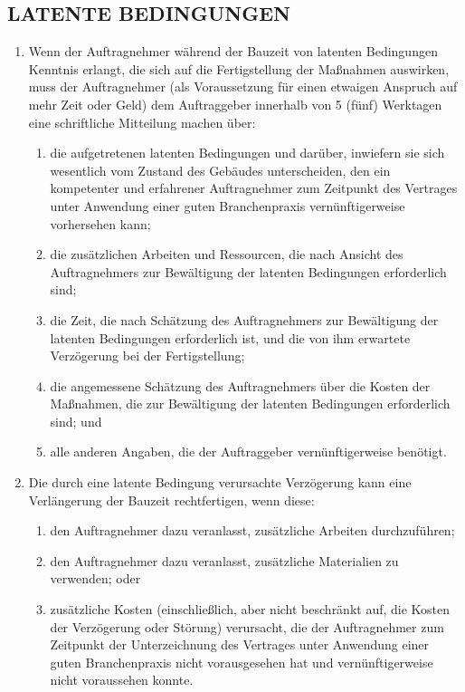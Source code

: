 \begin{multicols}{2}
  \subsection{LATENTE BEDINGUNGEN}
  \begin{enumerate}
    \item Wenn der Auftragnehmer während der Bauzeit von latenten Bedingungen Kenntnis erlangt, die sich auf die Fertigstellung der Maßnahmen auswirken, muss der Auftragnehmer (als Voraussetzung für einen etwaigen Anspruch auf mehr Zeit oder Geld) dem Auftraggeber innerhalb von 5 (fünf) Werktagen eine schriftliche Mitteilung machen über:
    \begin{enumerate}
   \item die aufgetretenen latenten Bedingungen und darüber, inwiefern sie sich wesentlich vom Zustand des Gebäudes unterscheiden, den ein kompetenter und erfahrener Auftragnehmer zum Zeitpunkt des Vertrages unter Anwendung einer guten Branchenpraxis vernünftigerweise vorhersehen kann;
   \item die zusätzlichen Arbeiten und Ressourcen, die nach Ansicht des Auftragnehmers zur Bewältigung der latenten Bedingungen erforderlich sind;
   \item die Zeit, die nach Schätzung des Auftragnehmers zur Bewältigung der latenten Bedingungen erforderlich ist, und die von ihm erwartete Verzögerung bei der Fertigstellung;
   \item die angemessene Schätzung des Auftragnehmers über die Kosten der Maßnahmen, die zur Bewältigung der latenten Bedingungen erforderlich sind; und
   \item alle anderen Angaben, die der Auftraggeber vernünftigerweise benötigt.
   \end{enumerate}
    \item Die durch eine latente Bedingung verursachte Verzögerung kann eine Verlängerung der Bauzeit rechtfertigen, wenn diese:
    \begin{enumerate}
   \item den Auftragnehmer dazu veranlasst, zusätzliche Arbeiten durchzuführen;
   \item den Auftragnehmer dazu veranlasst, zusätzliche Materialien zu verwenden; oder
   \item zusätzliche Kosten (einschließlich, aber nicht beschränkt auf, die Kosten der Verzögerung oder Störung) verursacht, die der Auftragnehmer zum Zeitpunkt der Unterzeichnung des Vertrages unter Anwendung einer guten Branchenpraxis nicht vorausgesehen hat und vernünftigerweise nicht voraussehen konnte.

\end{enumerate}
\end{enumerate}
\end{multicols}
